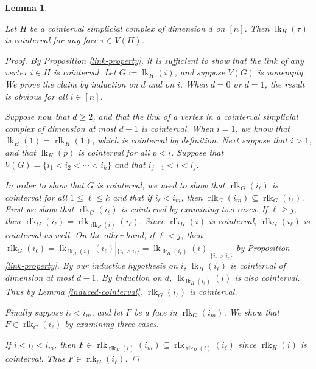 \documentclass[11pt]{amsart}
\newtheorem{lemma}[theorem]{Lemma}
\theoremstyle{definition}
\numberwithin{equation}{section}
\theoremstyle{remark}
\numberwithin{equation}{section}
\begin{document}
\begin{lemma} \label{links-cointerval}

Let $H$ be a cointerval simplicial complex of dimension $d$ on $[n]$.  Then $\operatorname{lk}_H(\tau)$ is cointerval for any face $\tau \in V(H)$.

\begin{proof}
By Proposition \ref{link-property}, it is sufficient to show that the link of any vertex $i \in H$ is cointerval. Let $G:= \operatorname{lk}_{H}(i)$, and suppose $V(G)$ is nonempty.  We prove the claim by induction on $d$ and on $i$.  When $d=0$ or $d=1$, the result is obvious for all $i \in [n]$. 

Suppose now that $d \geq 2$, and that the link of a vertex in a cointerval simplicial complex of dimension at most $d-1$ is cointerval.  When $i=1$, we know that $\operatorname{lk}_{H}(1) = \operatorname{rlk}_{H}(1)$, which is cointerval by definition.  Next suppose that $i>1$, and that $\operatorname{lk}_{H}(p)$ is cointerval for all $p<i$.  Suppose that $V(G) = \{i_1<i_2<\cdots<i_k\}$ and that $i_{j-1} < i < i_j$.  

In order to show that $G$ is cointerval, we need to show that $\operatorname{rlk}_{G}(i_{\ell})$ is cointerval for all $1 \leq \ell \leq k$ and that if $i_{\ell} < i_m$, then $\operatorname{rlk}_{G}(i_m) \subseteq \operatorname{rlk}_{G}(i_{\ell})$.  First we show that $\operatorname{rlk}_{G}(i_{\ell})$ is cointerval by examining two cases.  If $\ell \geq j$, then $\operatorname{rlk}_{G}(i_{\ell}) = \operatorname{rlk}_{\operatorname{rlk}_{H}(i)}(i_{\ell})$.  Since $\operatorname{rlk}_{H}(i)$ is cointerval, $\operatorname{rlk}_{G}(i_{\ell})$ is cointerval as well.  On the other hand, if $\ell < j$, then $\operatorname{rlk}_{G}(i_{\ell}) = \operatorname{lk}_{\operatorname{lk}_{H}(i)}(i_{\ell})|_{\{i_r>i_{\ell}\}} = \operatorname{lk}_{\operatorname{lk}_{H}(i_{\ell})}(i)|_{\{i_r > i_{\ell}\}}$ by Proposition \ref{link-property}.   By our inductive hypothesis on $i$, $\operatorname{lk}_{H}(i_{\ell})$ is cointerval of dimension at most $d-1$.  By induction on $d$, $\operatorname{lk}_{\operatorname{lk}_{H}(i_{\ell})}(i)$ is also cointerval.  Thus by Lemma \ref{induced-cointerval}, $\operatorname{rlk}_{G}(i_{\ell})$ is cointerval.

Finally suppose $i_{\ell} < i_m$, and let $F$ be a face in $\operatorname{rlk}_{G}(i_m)$.  We show that $F \in \operatorname{rlk}_{G}(i_{\ell})$ by examining three cases.  

If $i < i_{\ell} < i_m$, then $F \in \operatorname{rlk}_{\operatorname{rlk}_H(i)}(i_m) \subseteq \operatorname{rlk}_{\operatorname{rlk}_H(i)}(i_{\ell})$ since $\operatorname{rlk}_H(i)$ is cointerval.  Thus $F \in \operatorname{rlk}_{G}(i_{\ell})$.  


\end{proof}
\end{lemma}
\end{document}
